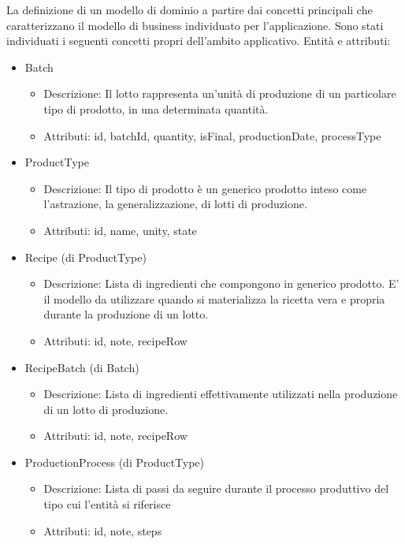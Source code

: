 \documentclass[a4paper,11pt]{article}
\begin{document}
La definizione di un modello di dominio a partire dai concetti principali che caratterizzano il modello di business individuato per l'applicazione.
Sono stati individuati i seguenti concetti propri dell'ambito applicativo.
Entità e attributi:

\begin{itemize}
  \item Batch
        \begin{itemize}
          \item Descrizione: Il lotto rappresenta un'unità di produzione di un particolare tipo di prodotto, in una determinata quantità.
          \item Attributi: id, batchId, quantity, isFinal, productionDate, processType
        \end{itemize}
  \item ProductType
        \begin{itemize}
          \item Descrizione: Il tipo di prodotto è un generico prodotto inteso come l'astrazione, la generalizzazione, di lotti di produzione.
          \item Attributi: id, name, unity, state
        \end{itemize}
  \item Recipe (di ProductType)
        \begin{itemize}
          \item Descrizione: Lista di ingredienti che compongono in generico prodotto. E' il modello da utilizzare quando si materializza la ricetta vera e propria durante la produzione di un lotto.
          \item Attributi: id, note, recipeRow
        \end{itemize}
  \item RecipeBatch (di Batch)
        \begin{itemize}
          \item Descrizione: Lista di ingredienti effettivamente utilizzati nella produzione di un lotto di produzione.
          \item Attributi: id, note, recipeRow
        \end{itemize}
  \item ProductionProcess (di ProductType)
        \begin{itemize}
          \item Descrizione: Lista di passi da seguire durante il processo produttivo del tipo cui l'entità si riferisce
          \item Attributi: id, note, steps

\end{itemize}
\end{itemize}
\end{document}
